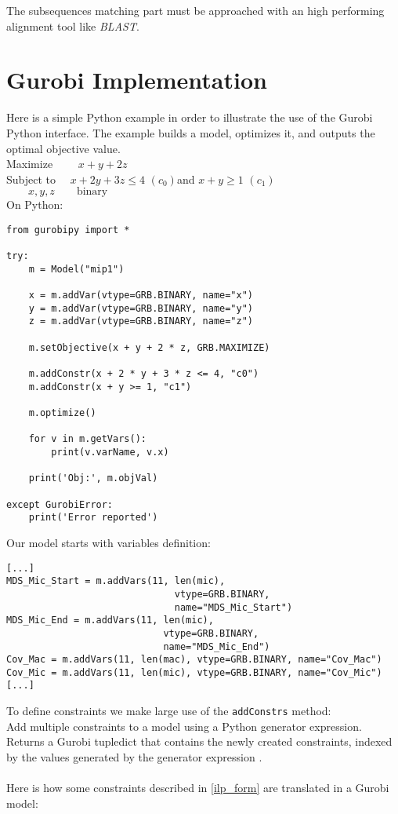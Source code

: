 The subsequences matching part must be approached with an high performing alignment tool like \textit{BLAST}.

\section{Gurobi Implementation}

Here is a simple Python example in order to illustrate the use of the Gurobi Python interface. The example builds a model, optimizes it, and outputs the optimal objective value. \\

\noindent Maximize $\qquad x + y + 2 z$ \\
Subject to $\quad x + 2 y + 3 z \leq  4$ $(c_0)$\quad and $x + y \geq 1 $ $(c_1)$\\
$\qquad x, y, z \qquad \text{binary}$ \\

On Python:

\begin{verbatim}
from gurobipy import *

try:
    m = Model("mip1")

    x = m.addVar(vtype=GRB.BINARY, name="x")
    y = m.addVar(vtype=GRB.BINARY, name="y")
    z = m.addVar(vtype=GRB.BINARY, name="z")

    m.setObjective(x + y + 2 * z, GRB.MAXIMIZE)

    m.addConstr(x + 2 * y + 3 * z <= 4, "c0")
    m.addConstr(x + y >= 1, "c1")

    m.optimize()

    for v in m.getVars():
        print(v.varName, v.x)

    print('Obj:', m.objVal)

except GurobiError:
    print('Error reported')
\end{verbatim}

Our model starts with variables definition:
\begin{verbatim}
[...]
MDS_Mic_Start = m.addVars(11, len(mic),
                              vtype=GRB.BINARY,
                              name="MDS_Mic_Start")
MDS_Mic_End = m.addVars(11, len(mic),
                            vtype=GRB.BINARY,
                            name="MDS_Mic_End")
Cov_Mac = m.addVars(11, len(mac), vtype=GRB.BINARY, name="Cov_Mac")
Cov_Mic = m.addVars(11, len(mic), vtype=GRB.BINARY, name="Cov_Mic")
[...]
\end{verbatim}

To define constraints we make large use of the \texttt{addConstrs} method:
\\
Add multiple constraints to a model using a Python generator expression. Returns a Gurobi tupledict that contains the newly created constraints, indexed by the values generated by the generator expression \cite{gurobi}.
\\\\
Here is how some constraints described in \ref{ilp_form} are translated in a Gurobi model: \\\\

